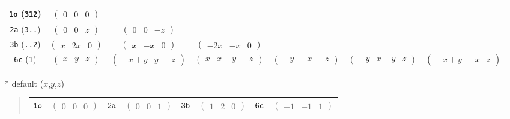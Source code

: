 \documentclass[fleqn,9pt,landscape]{jsarticle}
\begin{document}
\begin{center}
\begin{longtable}{ccccccc}
{\tt 1o} ({\tt 312}) & $ \begin{pmatrix} 0 & 0 & 0 \end{pmatrix} $ & $  $ & $  $ & $  $ & $  $ & $  $ \\ \hline
{\tt 2a} ({\tt 3..}) & $ \begin{pmatrix} 0 & 0 & z \end{pmatrix} $ & $ \begin{pmatrix} 0 & 0 & - z \end{pmatrix} $ & $  $ & $  $ & $  $ & $  $ \\ \hline
{\tt 3b} ({\tt ..2}) & $ \begin{pmatrix} x & 2 x & 0 \end{pmatrix} $ & $ \begin{pmatrix} x & - x & 0 \end{pmatrix} $ & $ \begin{pmatrix} - 2 x & - x & 0 \end{pmatrix} $ & $  $ & $  $ & $  $ \\ \hline
{\tt 6c} ({\tt 1}) & $ \begin{pmatrix} x & y & z \end{pmatrix} $ & $ \begin{pmatrix} - x + y & y & - z \end{pmatrix} $ & $ \begin{pmatrix} x & x - y & - z \end{pmatrix} $ & $ \begin{pmatrix} - y & - x & - z \end{pmatrix} $ & $ \begin{pmatrix} - y & x - y & z \end{pmatrix} $ & $ \begin{pmatrix} - x + y & - x & z \end{pmatrix} $ \\
\end{longtable}
\end{center}
* default ($x$,$y$,$z$)
\begin{quote}
\begin{tabular}{cccccccc}
$ {\tt 1o} $ & $ \begin{pmatrix} 0 & 0 & 0 \end{pmatrix} $ & $ {\tt 2a} $ & $ \begin{pmatrix} 0 & 0 & 1 \end{pmatrix} $ & $ {\tt 3b} $ & $ \begin{pmatrix} 1 & 2 & 0 \end{pmatrix} $ & $ {\tt 6c} $ & $ \begin{pmatrix} -1 & -1 & 1 \end{pmatrix} $
\end{tabular}
\end{quote}
\end{document}
